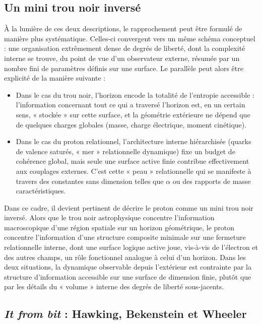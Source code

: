 \documentclass[11pt,a4paper]{article}
\begin{document}
\subsection{Un mini trou noir inversé}

À la lumière de ces deux descriptions, le rapprochement peut être formulé de manière plus systématique. Celles-ci convergent vers un même schéma conceptuel : une organisation extrêmement dense de degrés de liberté, dont la complexité interne se trouve, du point de vue d’un observateur externe, résumée par un nombre fini de paramètres définis sur une surface. Le parallèle peut alors être explicité de la manière suivante :
\begin{itemize}
  \item Dans le cas du trou noir, l’horizon encode la totalité de l’entropie accessible : l’information concernant tout ce qui a traversé l’horizon est, en un certain sens, « stockée » sur cette surface, et la géométrie extérieure ne dépend que de quelques charges globales (masse, charge électrique, moment cinétique).
  \item Dans le cas du proton relationnel, l’architecture interne hiérarchisée (quarks de valence saturés, « mer » relationnelle dynamique) fixe un budget de cohérence global, mais seule une surface active finie contribue effectivement aux couplages externes. C’est cette « peau » relationnelle qui se manifeste à travers des constantes sans dimension telles que \(\alpha\) ou des rapports de masse caractéristiques.
\end{itemize}

Dans ce cadre, il devient pertinent de décrire le proton comme un mini trou noir inversé. Alors que le trou noir astrophysique concentre l’information macroscopique d’une région spatiale sur un horizon géométrique, le proton concentre l’information d’une structure composite minimale sur une fermeture relationnelle interne, dont une surface logique active joue, vis-à-vis de l’électron et des autres champs, un rôle fonctionnel analogue à celui d’un horizon. Dans les deux situations, la dynamique observable depuis l’extérieur est contrainte par la structure d’information accessible sur une surface de dimension finie, plutôt que par les détails du « volume » interne des degrés de liberté sous-jacents.

\subsection{\emph{It from bit} : Hawking, Bekenstein et Wheeler}
\end{document}
